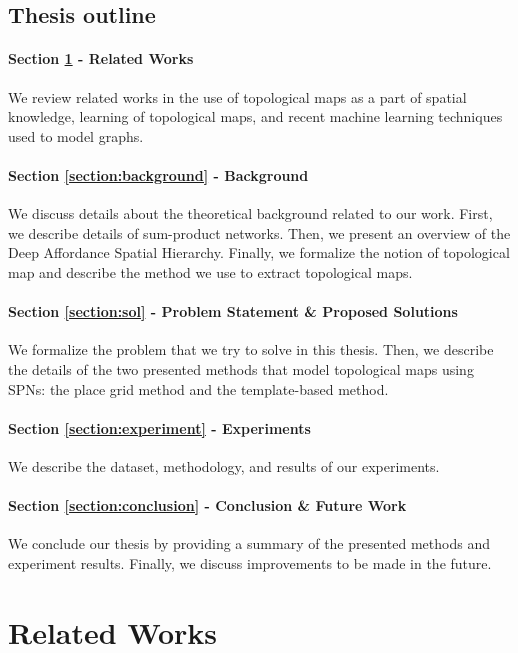 \documentclass[10pt, titlepage]{article}
\theoremstyle{definition}
\begin{document}
\subsection{Thesis outline}

\paragraph{Section \ref{section:related} - Related Works} We review related works in the use of topological maps as a part of spatial knowledge, learning of topological maps, and recent machine learning techniques used to model graphs.

\paragraph{Section \ref{section:background} - Background} We discuss details about the theoretical background related to our work. First, we describe details of sum-product networks. Then, we present an overview of the Deep Affordance Spatial Hierarchy. Finally, we formalize the notion of topological map and describe the method we use to extract topological maps.

\paragraph{Section \ref{section:sol} - Problem Statement \& Proposed Solutions} We formalize the problem that we try to solve in this thesis. Then, we describe the details of the two presented methods that model topological maps using SPNs: the place grid method and the template-based method.

\paragraph{Section \ref{section:experiment} - Experiments} We describe the dataset, methodology, and results of our experiments.

\paragraph{Section \ref{section:conclusion} - Conclusion \& Future Work} We conclude our thesis by providing a summary of the presented methods and experiment results. Finally, we discuss improvements to be made in the future.


\newpage
\section{Related Works}\label{section:related}
\end{document}
